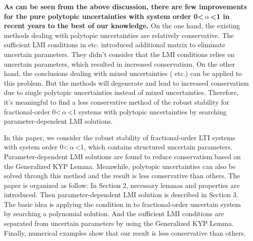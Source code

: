 \documentclass[]{interact}
\theoremstyle{plain}%
\theoremstyle{definition}
\theoremstyle{remark}
\begin{document}
\par \textbf{As can be seen from the above discussion, there are few improvements for the pure polytopic uncertainties with system order 0\textless\,$\alpha$\,\textless1 in recent years to the best of our knowledge.} On the one hand, the existing methods dealing with polytopic uncertainties are relatively conservative. The sufficient LMI conditions in \cite{Far2011, Lu2013a, Chen2015} etc. introduced additional matrix to eliminate uncertain parameters. They didn't consider that the LMI conditions relies on uncertain parameters, which resulted in increased conservatism. On the other hand, the conclusions dealing with mixed uncertainties (\citealp{Abo2017, Li2018} etc.) can be applied to this problem. But the methods will degenerate and lead to increased conservatism due to single polytopic uncertainties instead of mixed uncertainties. Therefore, it's meaningful to find a less conservative method of the robust stability for fractional-order 0\textless\,$\alpha$\,\textless1 systems with polytopic uncertainties by searching parameter-dependent LMI solutions. 
\par In this paper, we consider the robust stability of fractional-order LTI systems with system order 0\textless\,$\alpha$\,\textless1, which contains structured uncertain parameters. Parameter-dependent LMI solutions are found to reduce conservatism based on the Generalized KYP Lemma. Meanwhile, polytopic uncertainties can also be solved through this method and the result is less conservative than others. The paper is organized as follow: In Section 2, necessary lemmas and properties are introduced. Then parameter-dependent LMI solution is described in Section 3. The basic idea is applying the condition in \cite{Far2010} to fractional-order uncertain system by searching a polynomial solution. And the sufficient LMI conditions are separated from uncertain parameters by using the Generalized KYP Lemma. Finally, numerical examples show that our result is less conservative than others.
\end{document}
